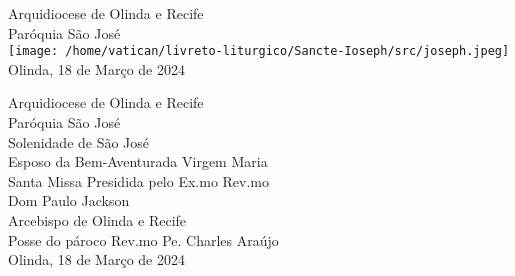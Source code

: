 \begin{center}
    \LARGE Arquidiocese de Olinda e Recife
    \vspace{.2cm} \\
    \Large Paróquia São José
    \vspace{2cm} \\
    \texttt{[image: /home/vatican/livreto-liturgico/Sancte-Ioseph/src/joseph.jpeg]}
    \vspace{\fill}\\
    \Large Olinda, 18 de Março de 2024
\end{center}
\newpage
\begin{center}
    \LARGE Arquidiocese de Olinda e Recife
    \vspace{.2cm} \\
    \Large Paróquia São José
    \vspace{5cm} \\
    \textcolor{VioletRed2}{\huge Solenidade de São José \\ Esposo da Bem-Aventurada Virgem Maria}
    \vspace{5cm} \\
    \Large Santa Missa Presidida pelo Ex.mo Rev.mo
    \vspace{.2cm} \\
    \textcolor{VioletRed2}{\huge Dom Paulo Jackson}
    \vspace{.2cm} \\
    \Large Arcebispo de Olinda e Recife
    \vspace{.5cm} \\
    \Large Posse do pároco Rev.mo Pe. Charles Araújo
    \vspace{.2cm}
    \vspace{\fill}\\
    \Large Olinda, 18 de Março de 2024
\end{center}
